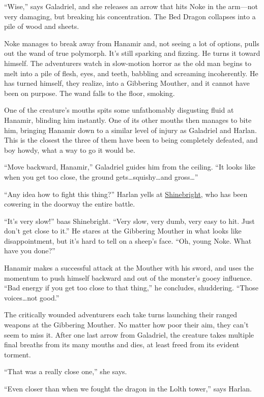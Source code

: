 \documentclass[smalldemyvopaper,11pt,twoside,onecolumn,openright,extrafontsizes]{memoir}
\begin{document}
``Wise,'' says Galadriel, and she releases an arrow that hits Noke in
the arm---not very damaging, but breaking his concentration. The Bed
Dragon collapses into a pile of wood and sheets.

Noke manages to break away from Hanamir and, not seeing a lot of
options, pulls out the wand of true polymorph. It's still sparking and
fizzing. He turns it toward himself. The adventurers watch in
slow-motion horror as the old man begins to melt into a pile of flesh,
eyes, and teeth, babbling and screaming incoherently. He has turned
himself, they realize, into a Gibbering Mouther, and it cannot have been
on purpose. The wand falls to the floor, smoking.

One of the creature's mouths spits some unfathomably disgusting fluid at
Hanamir, blinding him instantly. One of its other mouths then manages to
bite him, bringing Hanamir down to a similar level of injury as
Galadriel and Harlan. This is the closest the three of them have been to
being completely defeated, and boy howdy, what a way to go it would be.

``Move backward, Hanamir,'' Galadriel guides him from the ceiling. ``It
looks like when you get too close, the ground
gets\ldots squishy\ldots and gross\ldots{}''

``Any idea how to fight this thing?'' Harlan yells at
\href{/characters/shinebright/}{Shinebright}, who has been cowering in
the doorway the entire battle.

``It's very slow!'' baas Shinebright. ``Very slow, very dumb, very easy
to hit. Just don't get close to it.'' He stares at the Gibbering Mouther
in what looks like disappointment, but it's hard to tell on a sheep's
face. ``Oh, young Noke. What have you done?''

Hanamir makes a successful attack at the Mouther with his sword, and
uses the momentum to push himself backward and out of the monster's
gooey influence. ``Bad energy if you get too close to that thing,'' he
concludes, shuddering. ``Those voices\ldots not good.''

The critically wounded adventurers each take turns launching their
ranged weapons at the Gibbering Mouther. No matter how poor their aim,
they can't seem to miss it. After one last arrow from Galadriel, the
creature takes multiple final breaths from its many mouths and dies, at
least freed from its evident torment.

``That was a really close one,'' she says.

``Even closer than when we fought the dragon in the Lolth tower,'' says
Harlan.
\end{document}
